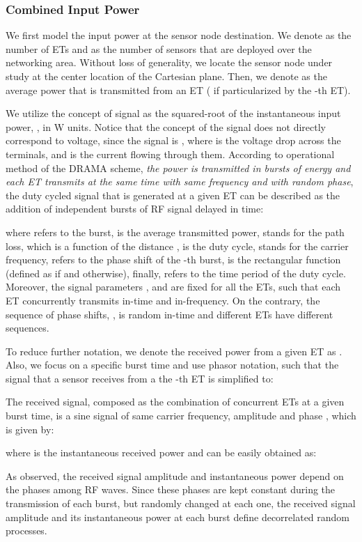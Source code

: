 \documentclass[conference]{IEEEtran}
\begin{document}
\subsubsection{Combined Input Power}

We first model the input power at the sensor node destination. We denote  as the number of ETs and  as the number of sensors that are deployed over the networking area.
Without loss of generality, we locate the sensor node under study at the center location of the Cartesian plane. Then, we denote  as the average power that is transmitted from an ET ( if particularized by the -th ET). 

We utilize the concept of signal  as the squared-root of the instantaneous input power, , in W units. Notice that the concept of the signal does not directly correspond to voltage, since the signal is , where  is the voltage drop across the terminals, and  is the current flowing through them.
According to operational method of the DRAMA scheme, \emph{the power is transmitted in bursts of energy and each ET transmits at the same time with same frequency and with random phase}, the duty cycled signal that is generated at a given ET can be described as the addition of independent bursts of RF signal delayed in time:

where  refers to the burst,  is the average transmitted power,  stands for the path loss, which is a function of the distance ,  is the duty cycle,  stands for the carrier frequency,  refers to the phase shift of the -th burst,  is the rectangular function (defined as  if  and  otherwise), finally,  refers to the time period of the duty cycle.
Moreover, the signal parameters ,  and  are fixed for all the ETs, such that each ET concurrently transmits in-time and in-frequency. On the contrary, the sequence of phase shifts, , is random in-time and different ETs have different sequences.
 
To reduce further notation, we denote the received power from a given ET as . 
Also, we focus on a specific burst time and use phasor notation, such that the signal that a sensor receives from a the -th ET is simplified to:


The received signal, composed as the combination of concurrent  ETs at a given burst time, is a sine signal of same carrier frequency, amplitude  and phase , which is given by:

where  is the instantaneous received power and can be easily obtained as:

As observed,
the received signal amplitude and instantaneous power depend on the phases among RF waves. Since these phases are kept constant during the transmission of each burst, but randomly changed at each one, the received signal amplitude and its instantaneous power at each burst define decorrelated random processes.
\end{document}
